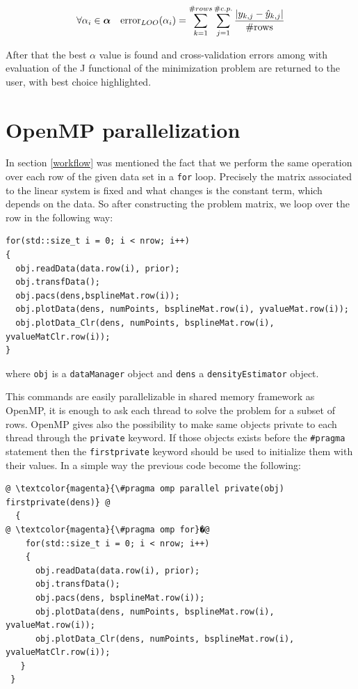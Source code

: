 \[ \forall \alpha_{i}\in\bm{\alpha}  \quad \text{error}_{LOO}(\alpha_{i}) = \sum_{k=1}^{\#rows}\sum_{j=1}^{\#c.p.} \frac{\\| y_{k,j}-\hat{y}_{k,j} \\| }{\text{\#rows}} \]

After that the best $\alpha$ value is found and cross-validation errors among with evaluation of the J functional of the minimization problem are returned to the user, with best choice highlighted.

\section{OpenMP parallelization} \label{openmp}
In section \ref{workflow} was mentioned the fact that we perform the same operation over each row of the given data set in a \verb|for| loop. Precisely the matrix associated to the linear system is fixed and what changes is the constant term, which depends on the data. So after constructing the problem matrix, we loop over the row in the following way:

\begin{lstlisting}
for(std::size_t i = 0; i < nrow; i++)
{
  obj.readData(data.row(i), prior);
  obj.transfData();
  obj.pacs(dens,bsplineMat.row(i));
  obj.plotData(dens, numPoints, bsplineMat.row(i), yvalueMat.row(i));
  obj.plotData_Clr(dens, numPoints, bsplineMat.row(i), yvalueMatClr.row(i));
}
\end{lstlisting}

where \verb|obj| is a \verb|dataManager| object and \verb|dens| a \verb|densityEstimator| object.

This commands are easily parallelizable in shared memory framework as OpenMP, it is enough to ask each thread to solve the problem for a subset of rows. OpenMP gives also the possibility to make same objects private to each thread through the \verb|private| keyword. If those objects exists before the \verb|#pragma| statement then the \verb|firstprivate| keyword should be used to initialize them with their values. In a simple way the previous code become the following:

\begin{lstlisting}
@ \textcolor{magenta}{\#pragma omp parallel private(obj) firstprivate(dens)} @
  {
@ \textcolor{magenta}{\#pragma omp for}�@
    for(std::size_t i = 0; i < nrow; i++)
    {
      obj.readData(data.row(i), prior);
      obj.transfData();
      obj.pacs(dens, bsplineMat.row(i));
      obj.plotData(dens, numPoints, bsplineMat.row(i), yvalueMat.row(i));
      obj.plotData_Clr(dens, numPoints, bsplineMat.row(i), yvalueMatClr.row(i));
   }
 }
\end{lstlisting}

